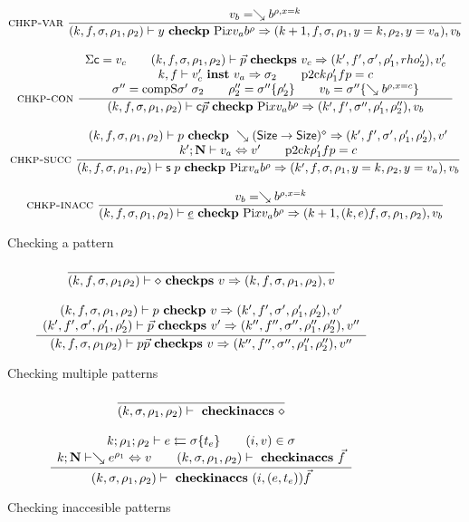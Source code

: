 \begin{figure}
\begin{gather*}
\mbox{\sc chkp-var}\ \dfrac{v_b = \searrow b^{\rho,x=k}}{
(k,f,\sigma,\rho_1,\rho_2)\vdash y\mbox{ \textbf{checkp} }\mathrm{Pi} x v_a b^{\rho}\Rightarrow (k+1,f,\sigma,\rho_1,y=k,\rho_2,y=v_a),v_b}
\\[2ex]
\mbox{\sc chkp-con}\ \dfrac{\begin{array}[b]{c}\mathrm{\Sigma}{\mathsf{c}}=v_c \qquad
(k,f,\sigma,\rho_1,\rho_2)\vdash\vec{p}\mbox{ \textbf{checkps} }v_c\Rightarrow (k',f',\sigma',\rho'_1,rho'_2),v'_c
\\k,f\vdash v'_c\mbox{ \textbf{inst} }v_a\Rightarrow \sigma_2 \qquad
\mathrm{p2c} k \rho'_1 f p =  c\\\sigma'' = \mathrm{compS}\sigma'\;\sigma_2 \qquad
\rho''_2 = \sigma''\{\rho'_2\} \qquad
v_b = \sigma''\{\searrow b^{\rho,x=c}\}
\end{array}}{(k,f,\sigma,\rho_1,\rho_2)\vdash\mathsf{c} \vec{p}\mbox{ \textbf{checkp} }\mathrm{Pi} x v_a b^{\rho}\Rightarrow (k',f',\sigma'',\rho'_1,\rho''_2),v_b
}
\\[2ex]
\mbox{\sc chkp-succ}\ \dfrac{\begin{array}[b]{c}
(k,f,\sigma,\rho_1,\rho_2)\vdash p\mbox{ \textbf{checkp} }\searrow (\mathsf{Size} \rightarrow \mathsf{Size})^{\diamond}\Rightarrow (k',f',\sigma',\rho'_1,\rho'_2),v'\\
k';\mathbf{N}\vdash v_a\Leftrightarrow v' \qquad
\mathrm{p2c} k \rho'_1 f p = c
\end{array}}{
(k,f,\sigma,\rho_1,\rho_2)\vdash\mathsf{s}\; p\mbox{ \textbf{checkp} }\mathrm{Pi} x v_a b^{\rho}\Rightarrow (k',f,\sigma,\rho_1,y=k,\rho_2,y=v_a),v_b}
\\[2ex]
\mbox{\sc chkp-inacc}\ \dfrac{v_b = \searrow b^{\rho,x=k}}{
(k,f,\sigma,\rho_1,\rho_2)\vdash\underline{e}\mbox{ \textbf{checkp} }\mathrm{Pi} x v_a b^{\rho}\Rightarrow (k+1,(k,e)f,\sigma,\rho_1,\rho_2),v_b}
\end{gather*}
\caption{Checking a pattern}
\end{figure}

\begin{figure}
\begin{gather*}
\ \dfrac{}{
(k,f,\sigma,\rho_1\rho_2)\vdash\diamond\mbox{ \textbf{checkps} }v\Rightarrow (k,f,\sigma,\rho_1,\rho_2),v}
\\[2ex]
\ \dfrac{\begin{array}[b]{c}(k,f,\sigma,\rho_1,\rho_2)\vdash p\mbox{ \textbf{checkp} }v\Rightarrow (k',f',\sigma',\rho'_1,\rho'_2),v'
\\(k',f',\sigma',\rho'_1,\rho'_2)\vdash\vec{p}\mbox{ \textbf{checkps} }v'\Rightarrow (k'',f'',\sigma'',\rho''_1,\rho''_2),v''
\end{array}}{
(k,f,\sigma,\rho_1\rho_2)\vdash p \vec{p}\mbox{ \textbf{checkps} }v\Rightarrow (k'',f'',\sigma'',\rho''_1,\rho''_2),v''}
\end{gather*}
\caption{Checking multiple patterns}
\end{figure}

\begin{figure}
\begin{gather*}
\ \dfrac{}{
(k,\sigma,\rho_1,\rho_2)\vdash\mbox{ \textbf{checkinaccs} }\diamond
}
\\[2ex]
\ \dfrac{\begin{array}[b]{c}
k;\rho_1;\rho_2\vdash e\leftleftarrows\sigma\{t_e\} \qquad (i,v) \in \sigma 
\\
k;\mathbf{N}\vdash\searrow e^{\rho_1}\Leftrightarrow v 
\qquad
(k,\sigma,\rho_1,\rho_2)\vdash\mbox{ \textbf{checkinaccs} }\vec{f}
\end{array}}{
(k,\sigma,\rho_1,\rho_2)\vdash\mbox{ \textbf{checkinaccs} }(i,(e,t_e)) \vec{f}
}
\end{gather*}
\caption{Checking inaccesible patterns}
\end{figure}


